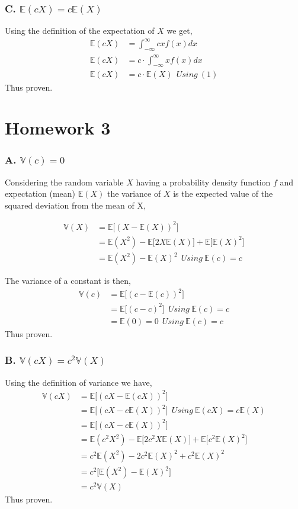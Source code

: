 \documentclass{article}
\begin{document}
\subsubsection*{C. $\mathbb{E}(cX)=c \mathbb{E}(X)$}
Using the definition of the expectation of $X$ we get,
\begin{align*}
    \mathbb{E}(cX) &= \int_{-\infty}^{\infty} cx f(x) dx\\
    \mathbb{E}(cX) &= c \cdot \int_{-\infty}^{\infty} x f(x) dx\\
    \mathbb{E}(cX) &= c \cdot \mathbb{E}(X) \ \ Using\ (1)
\end{align*}
Thus proven.

\section*{Homework 3}
\subsubsection*{A. $\mathbb{V}(c)=0$}
Considering the random variable $X$ having a probability density function $f$ and expectation (mean) $\mathbb{E}(X)$
the variance of $X$ is the expected value of the squared deviation from the mean of
X,

\begin{align*}
    \mathbb{V}(X) &= \mathbb{E}\big[(X-\mathbb{E}(X))^2 \big]\\
                &= \mathbb{E}(X^2) - \mathbb{E}\big[2X\mathbb{E}(X)\big] + \mathbb{E}\big[\mathbb{E}(X)^2\big]\\
                &= \mathbb{E}(X^2) - \mathbb{E}(X)^2 \ \ Using\ \mathbb{E}(c) = c
\end{align*}

The variance of a constant is then,
\begin{align*}
    \mathbb{V}(c) &= \mathbb{E}\big[(c-\mathbb{E}(c))^2 \big]\\
     &=  \mathbb{E}\big[(c-c)^2 \big] \ \ Using\ \mathbb{E}(c) = c\\
     &= \mathbb{E}(0) = 0 \ \ Using\ \mathbb{E}(c) = c
\end{align*} 
Thus proven.
\subsubsection*{B. $\mathbb{V}(cX)=c^2\mathbb{V}(X)$}
Using the definition of variance we have,
\begin{align*}
    \mathbb{V}(cX) &= \mathbb{E}\big[(cX-\mathbb{E}(cX))^2 \big]\\
     &= \mathbb{E}\big[(cX-c\mathbb{E}(X))^2 \big] \ \ Using\ \mathbb{E}(cX) = c\mathbb{E}(X)\\
     &= \mathbb{E}\big[(cX-c\mathbb{E}(X))^2 \big]\\
     &= \mathbb{E}(c^2X^2) - \mathbb{E}\big[2c^2X\mathbb{E}(X)\big] + \mathbb{E}\big[c^2\mathbb{E}(X)^2\big]\\
     &= c^2\mathbb{E}(X^2) - 2c^2\mathbb{E}(X)^2 + c^2\mathbb{E}(X)^2\\
     &= c^2 \big[\mathbb{E}(X^2) - \mathbb{E}(X)^2\big]\\
     &= c^2 \mathbb{V}(X)
\end{align*} 
Thus proven.
\end{document}
